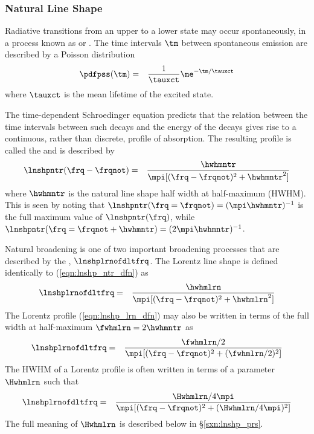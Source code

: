 \documentclass[12pt]{article}
\begin{document}
\subsubsection[Natural Line Shape]{Natural Line Shape}\label{sxn:lnshp_ntr}
Radiative transitions from an upper to a lower state may occur 
spontaneously, in a process known as  or
.
The time intervals $\tm$ between spontaneous emission are described by
a Poisson distribution 
\begin{eqnarray}
\pdfpss(\tm) & = & \frac{1}{\tauxct} \me^{-\tm / \tauxct}
\label{eqn:pss_dfn}
\end{eqnarray}
where $\tauxct$ is the mean lifetime of the excited state.

The time-dependent Schroedinger equation predicts that the relation
between the time intervals between such decays and the energy of the
decays gives rise to a continuous, rather than discrete, profile of 
absorption.
The resulting profile is called the   
and is described by  
\begin{eqnarray}
\lnshpntr(\frq-\frqnot) & = & \frac{\hwhmntr}{\mpi [ (\frq - \frqnot)^{2} + \hwhmntr^{2} ] }
\label{eqn:lnshp_ntr_dfn}
\end{eqnarray}
where $\hwhmntr$ is the natural line shape half width at half-maximum
(HWHM). 
This is seen by noting that $\lnshpntr(\frq = \frqnot) =
(\mpi\hwhmntr)^{-1}$ is the full maximum value of $\lnshpntr(\frq)$, while
$\lnshpntr(\frq = \frqnot + \hwhmntr) = (2\mpi\hwhmntr)^{-1}$.

Natural broadening is one of two important broadening processes that
are described by the , $\lnshplrnofdltfrq$.  
The Lorentz line shape is defined identically to
(\ref{eqn:lnshp_ntr_dfn}) as 
\begin{eqnarray}
\lnshplrnofdltfrq & = & \frac{\hwhmlrn}{\mpi [ (\frq - \frqnot)^{2} + \hwhmlrn^{2} ] }
\label{eqn:lnshp_lrn_dfn}
\end{eqnarray}
The Lorentz profile (\ref{eqn:lnshp_lrn_dfn}) may also be written in
terms of the full width at half-maximum $\fwhmlrn = 2\hwhmntr$ as
\begin{eqnarray}
\lnshplrnofdltfrq & = & \frac{\fwhmlrn/2}{\mpi [ (\frq - \frqnot)^{2} +
(\fwhmlrn/2)^{2} ] }
\label{eqn:lnshp_lrn_fwhm_dfn}
\end{eqnarray}
The HWHM of a Lorentz profile is often written in terms of a parameter 
$\Hwhmlrn$ such that 
\begin{eqnarray}
\lnshplrnofdltfrq & = & \frac{\Hwhmlrn/4\mpi}{\mpi [ (\frq - \frqnot)^{2} +
(\Hwhmlrn/4\mpi)^{2} ] }
\label{eqn:lnshp_lrn_Hwhm_dfn}
\end{eqnarray}
The full meaning of $\Hwhmlrn$ is described below in
\S\ref{sxn:lnshp_prs}.  
\end{document}
